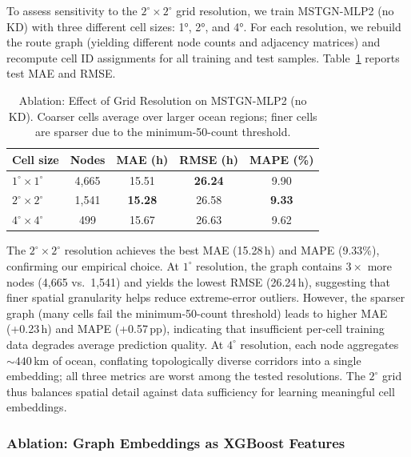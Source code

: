 \documentclass[conference]{IEEEtran}
\begin{document}
To assess sensitivity to the $2^\circ{\times}2^\circ$ grid resolution, we train MSTGN-MLP2 (no KD) with three different cell sizes: 1°, 2°, and 4°.
For each resolution, we rebuild the route graph (yielding different node counts and adjacency matrices) and recompute cell ID assignments for all training and test samples.
Table~\ref{tab:ablation_grid} reports test MAE and RMSE.

\begin{table}[t]
    \centering
    \caption{Ablation: Effect of Grid Resolution on MSTGN-MLP2 (no KD). Coarser cells average over larger ocean regions; finer cells are sparser due to the minimum-50-count threshold.}
    \label{tab:ablation_grid}
    \begin{tabular}{lcccc}
        \toprule
        \textbf{Cell size} & \textbf{Nodes} & \textbf{MAE (h)} & \textbf{RMSE (h)} & \textbf{MAPE (\%)} \\
        \midrule
        $1^\circ{\times}1^\circ$ & 4,665 & 15.51 & \textbf{26.24} & 9.90 \\
        $2^\circ{\times}2^\circ$ & 1,541 & \textbf{15.28} & 26.58 & \textbf{9.33} \\
        $4^\circ{\times}4^\circ$ & 499 & 15.67 & 26.63 & 9.62 \\
        \bottomrule
    \end{tabular}
\end{table}

The $2^\circ{\times}2^\circ$ resolution achieves the best MAE (15.28\,h) and MAPE (9.33\%), confirming our empirical choice.
At $1^\circ$ resolution, the graph contains $3{\times}$ more nodes (4,665 vs.\ 1,541) and yields the lowest RMSE (26.24\,h), suggesting that finer spatial granularity helps reduce extreme-error outliers.
However, the sparser graph (many cells fail the minimum-50-count threshold) leads to higher MAE (+0.23\,h) and MAPE (+0.57\,pp), indicating that insufficient per-cell training data degrades average prediction quality.
At $4^\circ$ resolution, each node aggregates $\sim\!440$\,km of ocean, conflating topologically diverse corridors into a single embedding; all three metrics are worst among the tested resolutions.
The $2^\circ$ grid thus balances spatial detail against data sufficiency for learning meaningful cell embeddings.


\subsubsection{Ablation: Graph Embeddings as XGBoost Features}
\label{sec:gcn_xgb_ablation}
\end{document}
